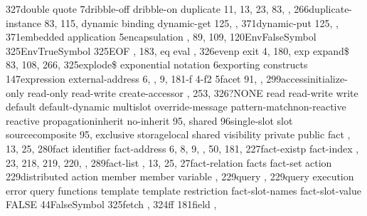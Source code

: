 \documentclass[letterpaper,10pt,english]{sphinxmanual}
\begin{document}
327double quote 7dribble-off dribble-on duplicate 11,
13, 23, 83, , 266duplicate-instance 83, 115, dynamic
binding dynamic-get 125, , 371dynamic-put 125, ,
371embedded application 5encapsulation , 89, 109,
120EnvFalseSymbol 325EnvTrueSymbol 325EOF , 183, eq
eval , 326evenp exit 4, 180, exp
expand\$ 83, 108, 266, 325explode\$ exponential notation
6exporting constructs 147expression external-address 6, ,
9, 181-f 4-f2 5facet 91, , 299accessinitialize-only
read-only read-write create-accessor ,
253, 326?NONE read read-write write
default default-dynamic multislot
override-message pattern-matchnon-reactive
reactive propagationinherit no-inherit 95,
shared 96single-slot slot sourcecomposite 95,
exclusive storagelocal shared
visibility private public fact
, 13, 25, 280fact identifier fact-address 6, 8, 9, ,
50, 181, 227fact-existp fact-index , 23, 218, 219, 220,
, 289fact-list , 13, 25, 27fact-relation facts
fact-set action 229distributed action member
member variable , 229query , 229query execution
error query functions template template
restriction fact-slot-names fact-slot-value
FALSE 44FalseSymbol 325fetch , 324ff 181field ,
\end{document}
